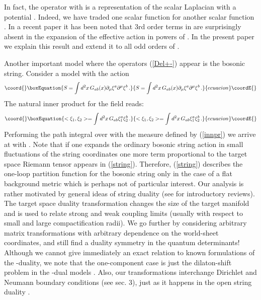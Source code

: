 \documentclass[a4paper,12pt]{article}
\begin{document}
In fact, the operator \myHighlight{$\Delta_+$}\coordHE{} with \coordHE{}
is a representation of the scalar Laplacian with a
potential \coordHE{}.
Indeed, we have traded one scalar function \coordHE{} for another
scalar function \myHighlight{$\phi$}\coordHE{}.
In a recent paper \cite{GusevZelnikov99}
it has been noted that 3rd order terms in \myHighlight{$\phi$}\coordHE{} are surprisingly 
absent in the expansion of the effective action in powers of \myHighlight{$\phi$}\coordHE{}. 
In the present paper we explain
this result and extend it to all odd orders of \myHighlight{$\phi$}\coordHE{}.

Another important model where the operators (\ref{Del+-})
appear is the bosonic string.
Consider a model with the action 
\begin{equation}\coord{}\boxEquation{
S=\int d^2x \, G_{ab}(x) \partial_\mu \xi^a \partial^\mu \xi^b \,.
\label{string}
}{
S=\int d^2x \, G_{ab}(x) \partial_\mu \xi^a \partial^\mu \xi^b \,.
}{ecuacion}\coordE{}\end{equation}
The natural inner product for the field \coordHE{} reads:
\begin{equation}\coord{}\boxEquation{
<\xi_{1},\xi_2>=\int d^2 x\, G_{ab}\xi^a_1\xi^b_2 \label{innpr}\,.
}{
<\xi_{1},\xi_2>=\int d^2 x\, G_{ab}\xi^a_1\xi^b_2 \,.
}{ecuacion}\coordE{}\end{equation}
Performing the path integral over \myHighlight{$\xi$}\coordHE{} with the measure
defined by (\ref{innpr}) we arrive at \myHighlight{$\det \Delta_+$}\coordHE{} 
with \coordHE{}. 
Note that if one expands the ordinary bosonic string
action in small fluctuations of the string coordinates
one more term proportional to the target space Riemann tensor
appears in (\ref{string}). Therefore, (\ref{string}) describes
the one-loop partition function for the bosonic string only
in the case of a flat background metric \coordHE{} which is perhaps
not of particular interest. Our analysis is rather motivated
by general ideas of string duality 
(see \cite{Giveon:1994fu,Alvarez:1995dn} for introductory reviews).
The target space duality transformation changes the size of the
target manifold and is used to relate strong and weak
coupling limits (usually with respect to small and large
compactification radii). We go further by considering 
arbitrary matrix transformations with arbitrary dependence
on the world-sheet coordinates, and still find a duality
symmetry in the quantum determinants! Although we cannot
give immediately an exact relation to known formulations of the
\coordHE{}-duality, we note that
the one-component case is just the dilaton-shift
problem in the \coordHE{}-dual models \cite{SchwarzZeitlin93}.
Also, our transformations interchange Dirichlet and
Neumann boundary conditions (see sec. 3), just as it
happens in the open string duality
\cite{Horava:1989ga,DLP89,Green:1991et,Bianchi:1992eu,
Dorn:1996an,Forste:1996hy}.
\end{document}
